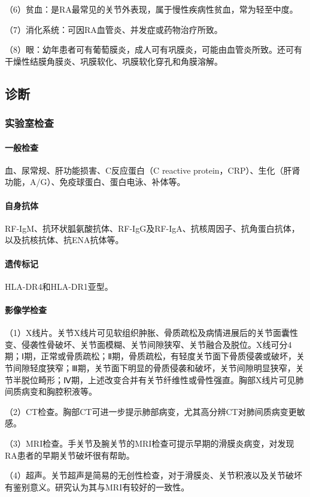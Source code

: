（6）贫血：是RA最常见的关节外表现，属于慢性疾病性贫血，常为轻至中度。

（7）消化系统：可因RA血管炎、并发症或药物治疗所致。

（8）眼：幼年患者可有葡萄膜炎，成人可有巩膜炎，可能由血管炎所致。还可有干燥性结膜角膜炎、巩膜软化、巩膜软化穿孔和角膜溶解。

\subsection{诊断}

\subsubsection{实验室检查}
\paragraph{一般检查}

血、尿常规、肝功能损害、C反应蛋白（C reactive
protein，CRP）、生化（肝肾功能，A/G）、免疫球蛋白、蛋白电泳、补体等。
\paragraph{自身抗体}

RF-IgM、抗环状胍氨酸抗体、RF-IgG及RF-IgA、抗核周因子、抗角蛋白抗体，以及抗核抗体、抗ENA抗体等。
\paragraph{遗传标记}

HLA-DR4和HLA-DR1亚型。
\paragraph{影像学检查}

（1）X线片。关节X线片可见软组织肿胀、骨质疏松及病情进展后的关节面囊性变、侵袭性骨破坏、关节面模糊、关节间隙狭窄、关节融合及脱位。X线可分4期；Ⅰ期，正常或骨质疏松；Ⅱ期，骨质疏松，有轻度关节面下骨质侵袭或破坏，关节间隙轻度狭窄；Ⅲ期，关节面下明显的骨质侵袭和破坏，关节间隙明显狭窄，关节半脱位畸形；Ⅳ期，上述改变合并有关节纤维性或骨性强直。胸部X线片可见肺间质病变和胸腔积液等。

（2）CT检查。胸部CT可进一步提示肺部病变，尤其高分辨CT对肺间质病变更敏感。

（3）MRI检查。手关节及腕关节的MRI检查可提示早期的滑膜炎病变，对发现RA患者的早期关节破坏很有帮助。

（4）超声。关节超声是简易的无创性检查，对于滑膜炎、关节积液以及关节破坏有鉴别意义。研究认为其与MRI有较好的一致性。

